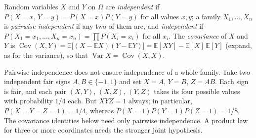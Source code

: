 \begin{definitionx}
Random variables $X$ and $Y$ on $\Omega$ are \emph{independent} if $P(X=x,\,Y=y)=P(X=x)P(Y=y)$ for all values $x,y$; a family $X_1,\dots,X_n$ is \emph{pairwise independent} if any two of them are, and \emph{independent} if $P(X_1=x_1,\dots,X_n=x_n)=\prod P(X_i=x_i)$ for all $x_i$. The \emph{covariance} of $X$ and $Y$ is $\operatorname{Cov}(X,Y)=\mathbb E\big[(X-\mathbb E X)(Y-\mathbb E Y)\big]=\mathbb E[XY]-\mathbb E[X]\,\mathbb E[Y]$ (expand, as for the variance), so that $\operatorname{Var}X=\operatorname{Cov}(X,X)$.
\end{definitionx}

Pairwise independence does not ensure independence of a whole family. Take two
independent fair signs $A,B\in\{-1,1\}$ and set $X=A$, $Y=B$, $Z=AB$.
Each sign is fair, and each pair $(X,Y)$, $(X,Z)$, $(Y,Z)$ takes its four
possible values with probability $1/4$ each. But $XYZ=1$ always; in particular,
$P(X=Y=Z=1)=1/4$, whereas $P(X=1)P(Y=1)P(Z=1)=1/8$.
The covariance identities below need only pairwise independence. A product law
for three or more coordinates needs the stronger joint hypothesis.

